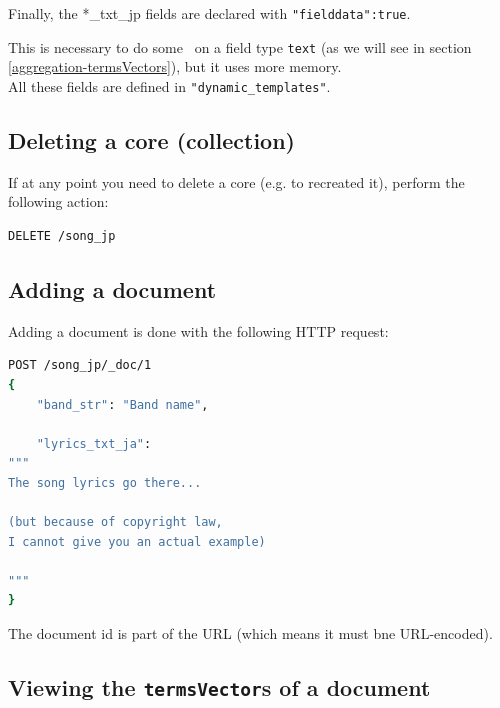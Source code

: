 \bigskip
\bigskip

Finally, the {*\_txt\_jp} fields are declared with \texttt{"fielddata":true}. 

This is necessary to do some \aggregations\ on a field type \texttt{text} (as we will see in section \ref{aggregation-termsVectors}), but it uses more memory. \\

All these fields are defined in \texttt{"dynamic\_templates"}.


\bigskip
\bigskip



\subsection{Deleting a core (collection)}

If at any point you need to delete a core (e.g. to recreated it), perform the following action: \\

\begin{lstlisting}[language=sh]
DELETE /song_jp
\end{lstlisting}

\bigskip



\subsection{Adding a document}

Adding a document is done with the following HTTP request:

\begin{lstlisting}[language=sh]
POST /song_jp/_doc/1
{
	"band_str": "Band name",
	
	"lyrics_txt_ja": 
"""
The song lyrics go there...

(but because of copyright law, 
I cannot give you an actual example)

"""		
}
\end{lstlisting}

\bigskip

The document id is part of the URL (which means it must bne URL-encoded). \\


\bigskip
\bigskip
\bigskip

\subsection{Viewing the \texttt{termsVector}s of a document} \label{es-viewing-termsVector}

